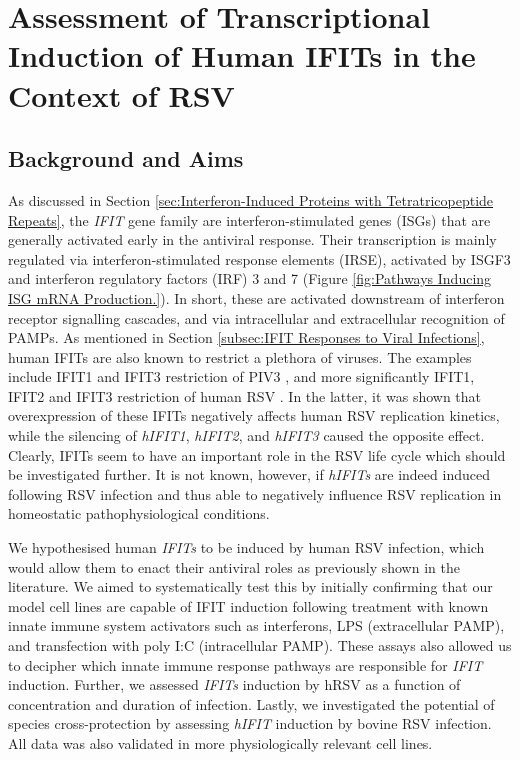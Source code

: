 \chapter{Assessment of Transcriptional Induction of Human IFITs in the Context of RSV} \label{ch:Assessment of Transcriptional Induction of Human IFITs in the Context of RSV}
\section{Background and Aims} \label{sec:Background and Aims-Chapter 1}
As discussed in Section \ref{sec:Interferon-Induced Proteins with Tetratricopeptide Repeats}, the \textit{IFIT} gene family are interferon-stimulated genes (ISGs) that are generally activated early in the antiviral response. Their transcription is mainly regulated via interferon-stimulated response elements (IRSE), activated by ISGF3 and interferon regulatory factors (IRF) 3 and 7 (Figure \ref{fig:Pathways Inducing ISG mRNA Production.}). In short, these are activated downstream of interferon receptor signalling cascades, and via intracellular and extracellular recognition of PAMPs. As mentioned in Section \ref{subsec:IFIT Responses to Viral Infections}, human IFITs are also known to restrict a plethora of viruses. The examples include IFIT1 and IFIT3 restriction of PIV3 \cite{Rabbani2016Identification3}, and more significantly IFIT1, IFIT2 and IFIT3 restriction of human RSV \cite{Drori2020InfluenzaProteins}. In the latter, it was shown that overexpression of these IFITs negatively affects human RSV replication kinetics, while the silencing of \textit{hIFIT1}, \textit{hIFIT2}, and \textit{hIFIT3} caused the opposite effect. Clearly, IFITs seem to have an important role in the RSV life cycle which should be investigated further. It is not known, however, if \textit{hIFITs} are indeed induced following RSV infection and thus able to negatively influence RSV replication in homeostatic pathophysiological conditions.

We hypothesised human \textit{IFITs} to be induced by human RSV infection, which would allow them to enact their antiviral roles as previously shown in the literature. We aimed to systematically test this by initially confirming that our model cell lines are capable of IFIT induction following treatment with known innate immune system activators such as interferons, LPS (extracellular PAMP), and transfection with poly I:C (intracellular PAMP). These assays also allowed us to decipher which innate immune response pathways are responsible for \textit{IFIT} induction. Further, we assessed \textit{IFITs} induction by hRSV as a function of concentration and duration of infection. Lastly, we investigated the potential of species cross-protection by assessing \textit{hIFIT} induction by bovine RSV infection. All data was also validated in more physiologically relevant cell lines. 


